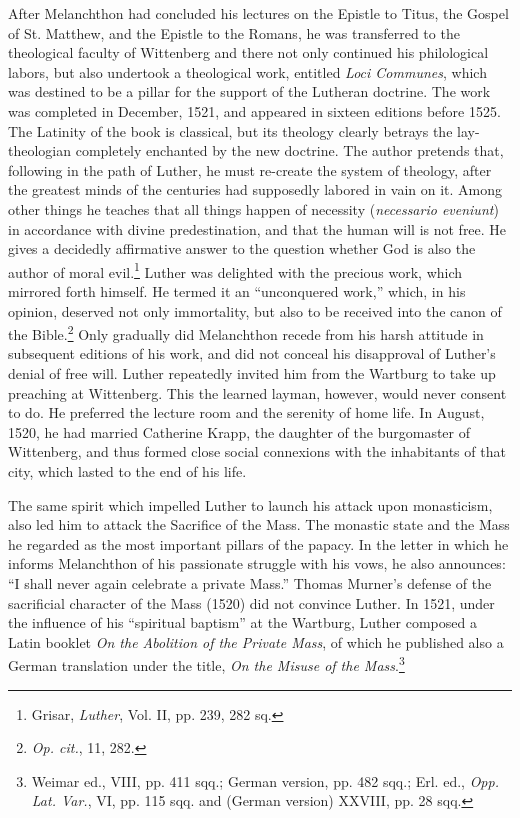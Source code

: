 After Melanchthon had concluded his lectures on the Epistle to
Titus, the Gospel of St. Matthew, and the Epistle to the Romans, he
was transferred to the theological faculty of Wittenberg and there
not only continued his philological labors, but also undertook a theological
work, entitled \textit{Loci Communes}, which was destined to be a
pillar for the support of the Lutheran doctrine. The work was completed
in December, 1521, and appeared in sixteen editions before
1525. The Latinity of the book is classical, but its theology clearly
betrays the lay-theologian completely enchanted by the new doctrine.
The author pretends that, following in the path of Luther, he
must re-create the system of theology, after the greatest minds of
the centuries had supposedly labored in vain on it. Among other
things he teaches that all things happen of necessity (\textit{necessario eveniunt})
in accordance with divine predestination, and that the human
will is not free. He gives a decidedly affirmative answer to the question
whether God is also the author of moral evil.\footnote{Grisar, \textit{Luther}, Vol. II, pp. 239, 282 sq.}
Luther was delighted with
the precious work, which mirrored forth himself. He
termed it an “unconquered work,” which, in his opinion, deserved not
only immortality, but also to be received into the canon of the Bible.\footnote{\textit{Op. cit.}, 11, 282.}
Only gradually did Melanchthon recede from his harsh attitude in
subsequent editions of his work, and did not conceal his disapproval
of Luther’s denial of free will. Luther repeatedly invited him from
the Wartburg to take up preaching at Wittenberg. This the learned
layman, however, would never consent to do. He preferred the lecture
room and the serenity of home life. In August, 1520, he had married Catherine
Krapp, the daughter of the burgomaster of Wittenberg,
and thus formed close social connexions with the inhabitants
of that city, which lasted to the end of his life.

The same spirit which impelled Luther to launch his attack upon
monasticism, also led him to attack the Sacrifice of the Mass. The
monastic state and the Mass he regarded as the most important pillars
of the papacy. In the letter in which he informs Melanchthon of his
passionate struggle with his vows, he also announces: “I shall never
again celebrate a private Mass.” Thomas Murner’s defense of the sacrificial
character of the Mass (1520) did not convince Luther. In 1521,
under the influence of his “spiritual baptism” at the Wartburg,
Luther composed a Latin booklet \textit{On the Abolition of the Private
Mass}, of which he published also a German translation under the title,
\textit{On the Misuse of the Mass}.\footnote
{Weimar ed., VIII, pp. 411 sqq.; German version, pp. 482 sqq.; Erl. ed., \textit{Opp. Lat. Var.},
VI, pp. 115 sqq. and (German version) XXVIII, pp. 28 sqq.}

